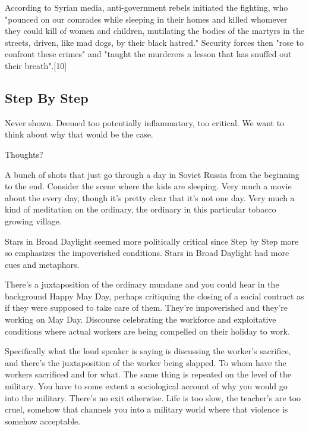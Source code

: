 \documentclass{article}
\begin{document}
\vspace{5mm}

According to Syrian media, anti-government rebels initiated the fighting, who "pounced on our comrades while sleeping in their homes and killed whomever they could kill of women and children, mutilating the bodies of the martyrs in the streets, driven, like mad dogs, by their black hatred." Security forces then "rose to confront these crimes" and "taught the murderers a lesson that has snuffed out their breath".[10]

\subsection{Step By Step}

Never shown.  Deemed too potentially inflammatory, too critical. We want to think about why that would be the case.  

\vspace{5mm}

Thoughts?  

\vspace{5mm}

A bunch of shots that just go through a day in Soviet Russia from the beginning to the end.  Consider the scene where the kids are sleeping.  Very much a movie about the every day, though it's pretty clear that it's not one day.  Very much a kind of meditation on the ordinary, the ordinary in this particular tobacco growing village.  

\vspace{5mm}

Stars in Broad Daylight seemed more politically critical since Step by Step more so emphasizes the impoverished conditions.  Stars in Broad Daylight had more cues and metaphors.  

\vspace{5mm}

There's a juxtaposition of the ordinary mundane and you could hear in the background Happy May Day, perhaps critiquing the closing of a social contract as if they were supposed to take care of them.  They're impoverished and they're working on May Day.  Discourse celebrating the workforce and exploitative conditions where actual workers are being compelled on their holiday to work.  

\vspace{5mm}

Specifically what the loud speaker is saying is discussing the worker's sacrifice, and there's the juxtaposition of the worker being slapped.  To whom have the workers sacrificed and for what.  The same thing is repeated on the level of the military.  You have to some extent a sociological account of why you would go into the military.  There's no exit otherwise.  Life is too slow, the teacher's are too cruel, somehow that channels you into a military world where that violence is somehow acceptable.  
\end{document}
